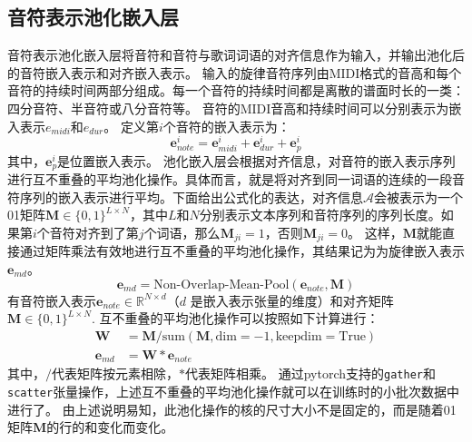 \subsection{音符表示池化嵌入层}
\label{sec:note_pooling}
音符表示池化嵌入层将音符和音符与歌词词语的对齐信息作为输入，并输出池化后的音符嵌入表示和对齐嵌入表示。
输入的旋律音符序列由MIDI格式的音高和每个音符的持续时间两部分组成。每一个音符的持续时间都是离散的谱面时长的一类：四分音符、半音符或八分音符等。
音符的MIDI音高和持续时间可以分别表示为嵌入表示$e_{midi}$和$e_{dur}$。
定义第$i$个音符的嵌入表示为：
\begin{equation}
\label{eq:note}
    \mathbf{e}_{note}^i = \mathbf{e}_{midi}^i + \mathbf{e}_{dur}^i + \mathbf{e}_p^i
\end{equation}
其中，$\mathbf{e}_p^i$是位置嵌入表示。
池化嵌入层会根据对齐信息，对音符的嵌入表示序列进行互不重叠的平均池化操作。具体而言，就是将对齐到同一词语的连续的一段音符序列的嵌入表示进行平均。下面给出公式化的表达，对齐信息$\mathcal{A}$会被表示为一个01矩阵$\mathbf{M} \in \{0,1\}^{L \times N}$，其中$L$和$N$分别表示文本序列和音符序列的序列长度。如果第$i$个音符对齐到了第$j$个词语，那么$\mathbf{M}_{ji}=1$，否则$\mathbf{M}_{ji}=0$。
这样，$\mathbf{M}$就能直接通过矩阵乘法有效地进行互不重叠的平均池化操作，其结果记为为旋律嵌入表示$\mathbf{e}_{md}$。
\begin{equation}
\label{eq:md_embed}
    \mathbf{e}_{md} = \text{Non-Overlap-Mean-Pool}(\mathbf{e}_{note}, \mathbf{M})
\end{equation}
有音符嵌入表示$\mathbf{e}_{note} \in \mathbb{R}^{N \times d}$（$d$ 是嵌入表示张量的维度）和对齐矩阵$\mathbf{M} \in \{0, 1\}^{L \times N}$.
互不重叠的平均池化操作可以按照如下计算进行：
\begin{align*}
\mathbf{W} &= \mathbf{M} / \text{sum}(\mathbf{M}, \text{dim}=-1, \text{keepdim}=\text{True}) \\
\mathbf{e}_{md} &= \mathbf{W} * \mathbf{e}_{note}
\end{align*}
其中，$/$代表矩阵按元素相除，$*$代表矩阵相乘。
通过pytorch支持的\texttt{gather}和\texttt{scatter}张量操作，上述互不重叠的平均池化操作就可以在训练时的小批次数据中进行了。
由上述说明易知，此池化操作的核的尺寸大小不是固定的，而是随着01矩阵$\mathbf{M}$的行的和变化而变化。

